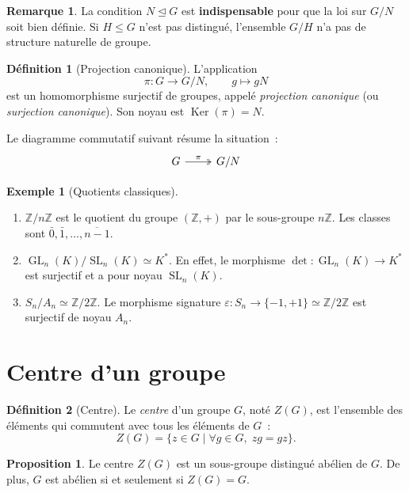 \documentclass[12pt,a4paper,openany]{book}
\theoremstyle{definition}
\newtheorem{definition}{Définition}[chapter]
\newtheorem{proposition}{Proposition}[chapter]
\newtheorem{remarque}{Remarque}[chapter]
\newtheorem{exemple}{Exemple}[chapter]
\newcommand{\Z}{\mathbb{Z}}
\DeclareMathOperator{\Ker}{Ker}
\DeclareMathOperator{\GL}{GL}
\DeclareMathOperator{\SL}{SL}
\newcommand{\iso}{\simeq}
\newcommand{\normal}{\trianglelefteq}
\begin{document}
\begin{remarque}
La condition $N \normal G$ est \textbf{indispensable} pour que la loi sur $G/N$ soit
bien définie. Si $H \leq G$ n'est pas distingué, l'ensemble $G/H$ n'a pas de structure
naturelle de groupe.
\end{remarque}

\begin{definition}[Projection canonique]
\label{def:projection-canonique}
L'application
\[
  \pi : G \longrightarrow G/N, \qquad g \longmapsto gN
\]
est un homomorphisme surjectif de groupes, appelé \emph{projection canonique} (ou
\emph{surjection canonique}). Son noyau est $\Ker(\pi) = N$.
\end{definition}

Le diagramme commutatif suivant résume la situation~:
\[
\begin{tikzcd}
  G \arrow[r, "\pi", two heads] & G/N
\end{tikzcd}
\]

\begin{exemple}[Quotients classiques]
\label{ex:quotients-classiques}
\begin{enumerate}[label=(\roman*)]
  \item $\Z / n\Z$ est le quotient du groupe $(\Z, +)$ par le sous-groupe $n\Z$. Les
    classes sont $\bar{0}, \bar{1}, \ldots, \overline{n-1}$.
  \item $\GL_n(K) / \SL_n(K) \iso K^*$. En effet, le morphisme $\det : \GL_n(K) \to
    K^*$ est surjectif et a pour noyau $\SL_n(K)$.
  \item $S_n / A_n \iso \Z/2\Z$. Le morphisme signature $\varepsilon : S_n \to \{-1,
    +1\} \iso \Z/2\Z$ est surjectif de noyau $A_n$.
\end{enumerate}
\end{exemple}

\section{Centre d'un groupe}
\label{sec:ch2-centre}

\begin{definition}[Centre]
\label{def:centre}
Le \emph{centre} d'un groupe $G$, noté $Z(G)$, est l'ensemble des éléments qui commutent
avec tous les éléments de $G$~:
\[
  Z(G) = \{ z \in G \mid \forall g \in G, \; zg = gz \}.
\]
\end{definition}

\begin{proposition}
\label{prop:centre-distingue}
Le centre $Z(G)$ est un sous-groupe distingué abélien de $G$. De plus, $G$ est abélien
si et seulement si $Z(G) = G$.
\end{proposition}
\end{document}
